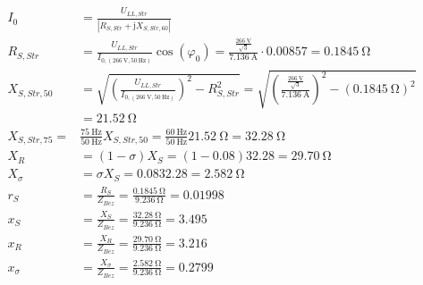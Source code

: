 \documentclass[11pt,a4paper]{scrartcl}
\newcommand{\mybr}[1]{\left(#1\right)}
\renewcommand{\j}{\mathrm{j}}
\newcommand{\0}{_{\mybr{0}}}
\newcommand{\1}{_{\mybr{1}}}
\newcommand{\2}{_{\mybr{2}}}
\begin{document}
\subsection{}
\begin{align}
I_0&=\frac{U_{LL,Str}}{\left|R_{S,Str}+\j X_{S,Str,60}\right|}\\
R_{S,Str}&=\frac{U_{LL,Str}}{I_{0,\mybr{\SI{266}{\volt},\SI{50}{\hertz}}}}\cos\mybr{\varphi_0}=\frac{\frac{\SI{266}{\volt}}{\sqrt{3}}}{\SI{7.136}{\ampere}}\cdot\num{0.00857}=\SI{0.1845}{\ohm}\\
X_{S,Str,50}&=\sqrt{\mybr{\frac{U_{LL,Str}}{I_{0,\mybr{\SI{266}{\volt},\SI{50}{\hertz}}}}}^2-R_{S,Str}^2}=\sqrt{\mybr{\frac{\frac{\SI{266}{\volt}}{\sqrt{3}}}{\SI{7.136}{\ampere}}}^2-\mybr{\SI{0.1845}{\ohm}}^2}\\
&=\SI{21.52}{\ohm}\\
X_{S,Str,75}=&\frac{\SI{75}{\hertz}}{\SI{50}{\hertz}}X_{S,Str,50}=\frac{\SI{60}{\hertz}}{\SI{50}{\hertz}}\SI{21.52}{\ohm}=\SI{32.28}{\ohm}\\
X_R&=\mybr{1-\sigma}X_S=\mybr{1-\num{0.08}}\SI{32.28}=\SI{29.70}{\ohm}\\
X_\sigma&=\sigma X_S=\num{0.08}\SI{32.28}=\SI{2.582}{\ohm}\\
r_S&=\frac{R_S}{Z_{Bez}}=\frac{\SI{0.1845}{\ohm}}{\SI{9.236}{\ohm}}=\num{0.01998}\\
x_S&=\frac{X_S}{Z_{Bez}}=\frac{\SI{32.28}{\ohm}}{\SI{9.236}{\ohm}}=\num{3.495}\\
x_R&=\frac{X_R}{Z_{Bez}}=\frac{\SI{29.70}{\ohm}}{\SI{9.236}{\ohm}}=\num{3.216}\\
x_\sigma&=\frac{X_\sigma}{Z_{Bez}}=\frac{\SI{2.582}{\ohm}}{\SI{9.236}{\ohm}}=\num{0.2799}
\end{align}
\end{document}
